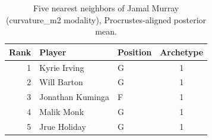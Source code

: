 \begin{table}[htbp]
  \centering\small
  \begin{tabular}{rllc}
    \toprule
    Rank & Player & Position & Archetype \\
    \midrule
    1 & Kyrie Irving & G & 1 \\
    2 & Will Barton & G & 1 \\
    3 & Jonathan Kuminga & F & 1 \\
    4 & Malik Monk & G & 1 \\
    5 & Jrue Holiday & G & 1 \\
    \bottomrule
  \end{tabular}
  \caption{Five nearest neighbors of Jamal Murray (curvature_m2 modality), Procrustes-aligned posterior mean.}
  \label{tab:Jamal_Murray_neighbors_curvature_m2}
\end{table}

